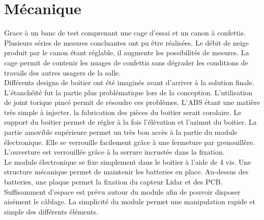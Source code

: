 \section{Mécanique}
Grace à un banc de test comprenant une cage d’essai et un canon à confettis. Plusieurs séries de mesures 
concluantes ont pu être réalisées. Le débit de neige produit par le canon étant réglable, il augmente les 
possibilités de mesures. La cage permit de contenir les nuages de confettis sans dégrader les conditions 
de travails des autres usagers de la salle.\\
Différents designs de boitier ont été imaginés avant d’arriver à la solution finale. L’étanchéité fut la 
partie plus problématique lors de la conception. L’utilisation de joint torique pincé permit de résoudre 
ces problèmes. L’ABS étant une matière très simple à injecter, la fabrication des pièces du boitier serait 
corolaire. Le support du boitier permet de régler à la fois l’élévation et l’azimut du boitier. La partie 
amovible supérieure permet un très bon accès à la partie du module électronique. Elle se verrouille facilement 
grâce à une fermeture par grenouillère. L’ouverture est verrouillée grâce à la serrure incrustée dans la 
fixation.\\
Le module électronique se fixe simplement dans le boitier à l’aide de 4 vis. Une structure mécanique permet 
de maintenir les batteries en place. Au-dessus des batteries, une plaque permet la fixation du capteur Lidar 
et des PCB. Suffisamment d’espace est prévu autour du module afin de pouvoir disposer aisément le câblage. 
La simplicité du module permet une manipulation rapide et simple des différents éléments.